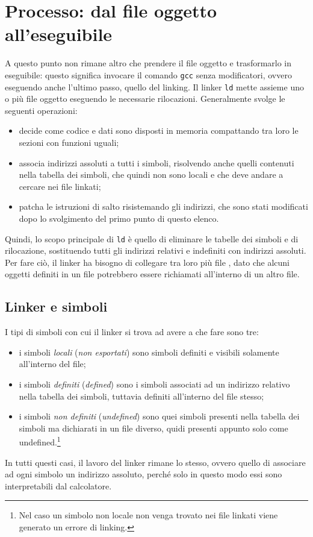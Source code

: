 \documentclass[class=book, crop=false, oneside]{standalone}
\begin{document}
\section{Processo: dal file oggetto all'eseguibile}
A questo punto non rimane altro che prendere il file oggetto e trasformarlo in eseguibile: questo significa invocare il comando \texttt{gcc} senza modificatori, ovvero eseguendo anche l'ultimo passo, quello del linking.
Il linker \texttt{ld} mette assieme uno o più file oggetto eseguendo le necessarie rilocazioni. Generalmente svolge le seguenti operazioni:
\begin{itemize}
	\item decide come codice e dati sono disposti in memoria compattando tra loro le sezioni con funzioni uguali;
	\item associa indirizzi assoluti a tutti i simboli, risolvendo anche quelli contenuti nella tabella dei simboli, che quindi non sono locali e che deve andare a cercare nei file  linkati;
	\item patcha le istruzioni di salto risistemando gli indirizzi, che sono stati modificati dopo lo svolgimento del primo punto di questo elenco.
\end{itemize}
Quindi, lo scopo principale di \texttt{ld} è quello di eliminare le tabelle dei simboli e di rilocazione, sostituendo tutti gli indirizzi relativi e indefiniti con indirizzi assoluti. Per fare ciò, il linker ha bisogno di collegare tra loro più file , dato che alcuni oggetti definiti in un file potrebbero essere richiamati all'interno di un altro file.

\subsection{Linker e simboli}
I tipi di simboli con cui il linker si trova ad avere a che fare sono tre:
\begin{itemize}
	\item i simboli \emph{locali} (\emph{non esportati}) sono simboli definiti e visibili solamente all'interno del file;
	\item i simboli \emph{definiti} (\emph{defined}) sono i simboli associati ad un indirizzo relativo nella tabella dei simboli, tuttavia definiti all'interno del file stesso;
	\item i simboli \emph{non definiti} (\emph{undefined}) sono quei simboli presenti nella tabella dei simboli ma dichiarati in un file diverso, quidi presenti appunto solo come undefined.\footnote{Nel caso un simbolo non locale non venga trovato nei file  linkati viene generato un errore di linking.}
\end{itemize}
In tutti questi casi, il lavoro del linker rimane lo stesso, ovvero quello di associare ad ogni simbolo un indirizzo assoluto, perché solo in questo modo essi sono interpretabili dal calcolatore.
\end{document}
